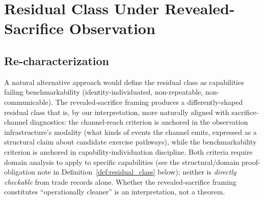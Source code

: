\section{Residual Class Under Revealed-Sacrifice Observation}
\label{sec:residual_class}

\subsection{Re-characterization}

A natural alternative approach would define the residual class as
capabilities failing benchmarkability (identity-individuated,
non-repeatable, non-communicable).  The revealed-sacrifice framing
produces a differently-shaped residual class that is, by our
interpretation, more naturally aligned with sacrifice-channel
diagnostics: the channel-reach criterion is anchored in the
observation infrastructure's modality (what kinds of events the
channel emits, expressed as a structural claim about candidate
exercise pathways), while the benchmarkability criterion is
anchored in capability-individuation discipline.  Both criteria
require domain analysis to apply to specific capabilities (see
the structural/domain proof-obligation note in
Definition~\ref{def:residual_class} below); neither is
\emph{directly checkable} from trade records alone.  Whether the
revealed-sacrifice framing constitutes ``operationally cleaner''
is an interpretation, not a theorem.


